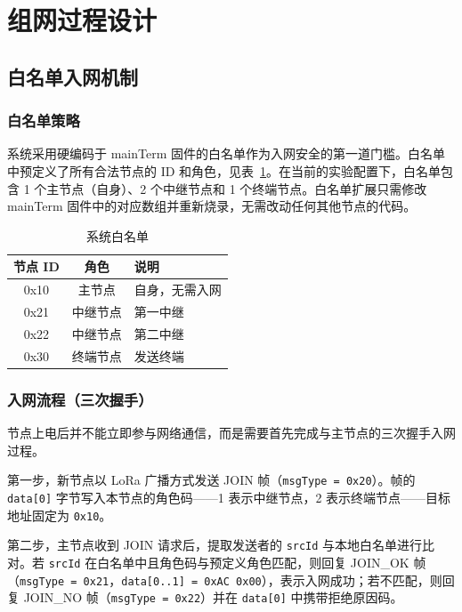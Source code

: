 \documentclass[12pt,a4paper]{ctexart}
\newcommand{\tblheaderstyle}{\sffamily\small\color{white}}
\begin{document}
\section{组网过程设计}
\label{sec:networking}

\subsection{白名单入网机制}

\subsubsection{白名单策略}

系统采用硬编码于 mainTerm 固件的白名单作为入网安全的第一道门槛。白名单中预定义了所有合法节点的 ID 和角色，见表~\ref{tab:whitelist}。在当前的实验配置下，白名单包含 1 个主节点（自身）、2 个中继节点和 1 个终端节点。白名单扩展只需修改 mainTerm 固件中的对应数组并重新烧录，无需改动任何其他节点的代码。

\begin{table}[htbp]
\centering
\caption{系统白名单}
\label{tab:whitelist}
\begin{tabularx}{0.7\textwidth}{c c >{\raggedright\arraybackslash}X}
\toprule
\rowcolor{tblhead}\tblheaderstyle 节点 ID & \tblheaderstyle 角色 & \tblheaderstyle 说明 \\
\midrule
0x10 & 主节点   & 自身，无需入网 \\
0x21 & 中继节点 & 第一中继 \\
0x22 & 中继节点 & 第二中继 \\
0x30 & 终端节点 & 发送终端 \\
\bottomrule
\end{tabularx}
\end{table}

\subsubsection{入网流程（三次握手）}

节点上电后并不能立即参与网络通信，而是需要首先完成与主节点的三次握手入网过程。

第一步，新节点以 LoRa 广播方式发送 JOIN 帧（\texttt{msgType = 0x20}）。帧的 \texttt{data[0]} 字节写入本节点的角色码——1 表示中继节点，2 表示终端节点——目标地址固定为 \texttt{0x10}。

第二步，主节点收到 JOIN 请求后，提取发送者的 \texttt{srcId} 与本地白名单进行比对。若 \texttt{srcId} 在白名单中且角色码与预定义角色匹配，则回复 JOIN\_OK 帧（\texttt{msgType = 0x21}，\texttt{data[0..1] = 0xAC 0x00}），表示入网成功；若不匹配，则回复 JOIN\_NO 帧（\texttt{msgType = 0x22}）并在 \texttt{data[0]} 中携带拒绝原因码。
\end{document}
